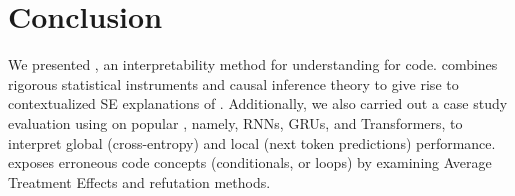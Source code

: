 
\chapter{Conclusion}
\label{ch:conclusion}

We presented \codegen, an interpretability method for understanding \nlms for code. \codegen combines rigorous statistical instruments and causal inference theory to give rise to contextualized SE explanations of \nlms. Additionally, we also carried out a case study evaluation using \codegen on popular \nlms, namely, RNNs, GRUs, and Transformers, to interpret global (\ie cross-entropy) and local (\ie next token predictions) performance. \codegen exposes erroneous code concepts (\eg conditionals, or loops) by examining Average Treatment Effects and refutation methods.

